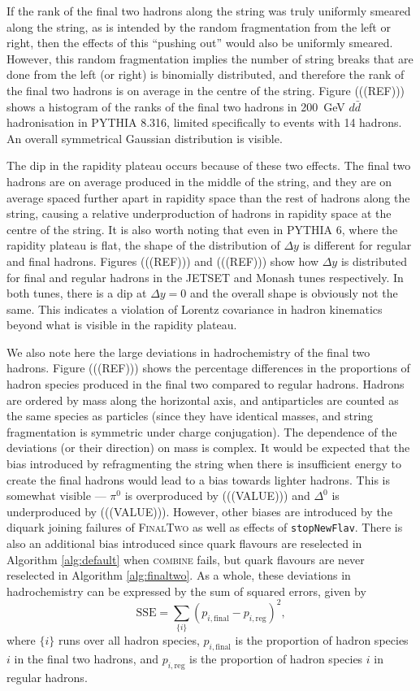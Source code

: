 \documentclass[12pt,a4paper]{report}
\begin{document}
If the rank of the final two hadrons along the string was truly uniformly smeared along the string, as is intended by the random fragmentation from the left or right, then the effects of this ``pushing out'' would also be uniformly smeared. However, this random fragmentation implies the number of string breaks that are done from the left (or right) is binomially distributed, and therefore the rank of the final two hadrons is on average in the centre of the string. Figure (((REF))) shows a histogram of the ranks of the final two hadrons in \qty{200}{\giga\electronvolt} $d\bar{d}$ hadronisation in PYTHIA 8.316, limited specifically to events with 14 hadrons. An overall symmetrical Gaussian distribution is visible.

The dip in the rapidity plateau occurs because of these two effects. The final two hadrons are on average produced in the middle of the string, and they are on average spaced further apart in rapidity space than the rest of hadrons along the string, causing a relative underproduction of hadrons in rapidity space at the centre of the string. It is also worth noting that even in PYTHIA 6, where the rapidity plateau is flat, the shape of the distribution of $\Delta y$ is different for regular and final hadrons. Figures (((REF))) and (((REF))) show how $\Delta y$ is distributed for final and regular hadrons in the JETSET and Monash tunes respectively. In both tunes, there is a dip at $\Delta y = 0$ and the overall shape is obviously not the same. This indicates a violation of Lorentz covariance in hadron kinematics beyond what is visible in the rapidity plateau.

We also note here the large deviations in hadrochemistry of the final two hadrons. Figure (((REF))) shows the percentage differences in the proportions of hadron species produced in the final two compared to regular hadrons. Hadrons are ordered by mass along the horizontal axis, and antiparticles are counted as the same species as particles (since they have identical masses, and string fragmentation is symmetric under charge conjugation). The dependence of the deviations (or their direction) on mass is complex. It would be expected that the bias introduced by refragmenting the string when there is insufficient energy to create the final hadrons would lead to a bias towards lighter hadrons. This is somewhat visible --- $\pi^0$ is overproduced by (((VALUE))) and $\Delta^0$ is underproduced by (((VALUE))). However, other biases are introduced by the diquark joining failures of \textsc{FinalTwo} as well as effects of \texttt{stopNewFlav}. There is also an additional bias introduced since quark flavours are reselected in Algorithm \ref{alg:default} when \textsc{combine} fails, but quark flavours are never reselected in Algorithm \ref{alg:finaltwo}. As a whole, these deviations in hadrochemistry can be expressed by the sum of squared errors, given by
\begin{equation}
  \text{SSE} = \sum_{\{i\}} (p_{i,\text{final}} - p_{i,\text{reg}})^2,
\end{equation}
where $\{i\}$ runs over all hadron species, $p_{i,\text{final}}$ is the proportion of hadron species $i$ in the final two hadrons, and $p_{i,\text{reg}}$ is the proportion of hadron species $i$ in regular hadrons.
\end{document}
